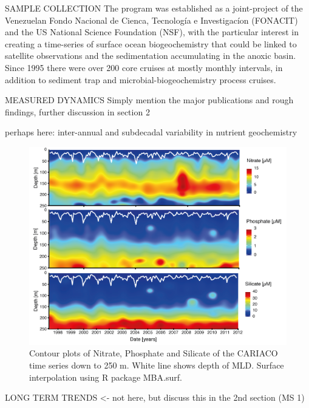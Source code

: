 SAMPLE COLLECTION
The program was established as a joint-project of the Venezuelan Fondo Nacional de Cienca, Tecnolog\'{i}a e Investigac\'{i}on (FONACIT) and the US National Science Foundation (NSF), with the particular interest in creating a time-series of surface ocean biogeochemistry that could be linked to satellite observations and the sedimentation accumulating in the anoxic basin. Since 1995 there were over 200 core cruises at mostly monthly intervals, in addition to sediment trap and microbial-biogeochemistry process cruises. 


MEASURED DYNAMICS
Simply mention the major publications and rough findings, further discussion in section 2

perhaps here:
inter-annual and subdecadal variability in nutrient geochemistry \citep{Scranton2014}

\begin{figure}
\centering
\includegraphics[trim = 0mm 0mm 0mm 0mm, clip, width=0.9\linewidth]{./Chp1-Intro/NUTSatCARIACOAsset811.png}
\caption[Scheme]{\small {Contour plots of Nitrate, Phosphate and Silicate of the CARIACO time series down to 250 m. White line shows depth of MLD. Surface interpolation using R package MBA.surf.}}
\label{CARIACO-map}
\end{figure}


LONG TERM TRENDS <- not here, but discuss this in the 2nd section (MS 1)

